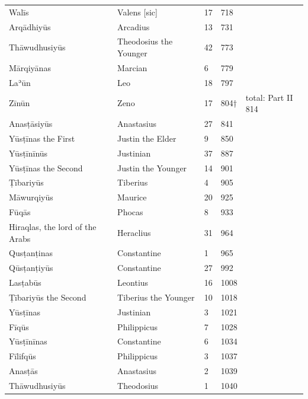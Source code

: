 {\begin{longtable}{L{38mm}L{38mm}R{13mm}R{13mm}L{32mm}}
Walīs & Valens [sic] & 17 & 718 & \\
Arqādhiyūs & Arcadius & 13 & 731 & \\
Thāwudhusiyūs & Theodosius the Younger & 42 & 773 & \\
Mārqiyānas & Marcian & 6 & 779 & \\
Laʾūn & Leo & 18 & 797 & \\
Zīnūn & Zeno & 17 & 804† & total: Part II 814\\
Anasṭāsiyūs & Anastasius & 27 & 841 & \\
Yūsṭīnas the First & Justin the Elder & 9 & 850 & \\
Yūsṭīnīnūs & Justinian & 37 & 887 & \\
Yūsṭīnas the Second & Justin the Younger & 14 & 901 & \\
Ṭībariyūs & Tiberius & 4 & 905 & \\
Māwurqiyūs & Maurice & 20 & 925 & \\
Fūqās & Phocas & 8 & 933 & \\
Hiraqlas, the lord of the Arabs & Heraclius & 31 & 964 & \\
Qusṭanṭinas & Constantine & 1 & 965 & \\
Qūsṭanṭiyūs & Constantine & 27 & 992 & \\
Lasṭabūs & Leontius & 16 & 1008 & \\
Ṭībariyūs the Second & Tiberius the Younger & 10 & 1018 & \\
Yūsṭīnas & Justinian & 3 & 1021 & \\
Fīqūs & Philippicus & 7 & 1028 & \\
Yūsṭīnīnas & Constantine & 6 & 1034 & \\
Fīlifqūs & Philippicus & 3 & 1037 & \\
Anasṭās & Anastasius & 2 & 1039 & \\
Thāwudhusiyūs & Theodosius & 1 & 1040 & \\
\end{longtable}}
\par{}\nopagebreak{}
